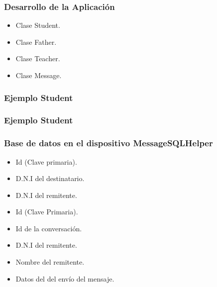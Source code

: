 \begin{frame}
	\frametitle{Desarrollo de la Aplicación}
		\begin{itemize}
			\item Clase {\ttfamily Student}.
			\item Clase {\ttfamily Father}.
			\item Clase {\ttfamily Teacher}.
			\item Clase {\ttfamily Message}.
		\end{itemize}
	\endblock{}
\end{frame}


\begin{frame}
	\frametitle{Ejemplo {\ttfamily Student}}
	
\end{frame}


\begin{frame}
	\frametitle{Ejemplo {\ttfamily Student}}
	
\end{frame}


\begin{frame}
	\frametitle{Base de datos en el dispositivo {\ttfamily MessageSQLHelper}}
		\begin{itemize}
			\item Id (Clave primaria).
			\item D.N.I del destinatario.
			\item D.N.I del remitente.
		\end{itemize}
	\endblock{}
		\begin{itemize}
			\item Id (Clave Primaria).
			\item Id de la conversación.
			\item D.N.I del remitente.
			\item Nombre del remitente.
			\item Datos del del envío del mensaje.
		\end{itemize}
	\endblock{}
\end{frame}


